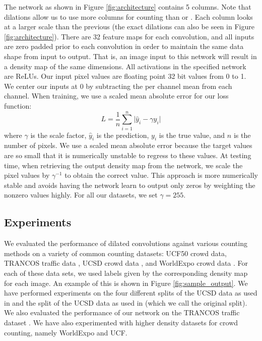 \documentclass[10pt,twocolumn,letterpaper]{article}
\begin{document}
The network as shown in Figure \ref{fig:architecture} contains 5 columns. Note that dilations allow us to use more columns for counting than \cite{zhang2016single} or \cite{chen2017deeplab}. Each column looks at a larger scale than the previous (the exact dilations can also be seen in Figure \ref{fig:architecture}). There are 32 feature maps for each convolution, and all inputs are zero padded prior to each convolution in order to maintain the same data shape from input to output. That is, an image input to this network will result in a density map of the same dimensions. All activations in the specified network are ReLUs. Our input pixel values are floating point 32 bit values from 0 to 1. We center our inputs at 0 by subtracting the per channel mean from each channel. When training, we use a scaled mean absolute error for our loss function:
\begin{equation}
L = \frac{1}{n}\sum_{i=1}^n\lvert \hat{y}_i - \gamma y_i \rvert
\end{equation}
where \(\gamma\) is the scale factor, \(\hat{y}_i\) is the prediction, \(y_i\) is the true value, and \(n\) is the number of pixels. We use a scaled mean absolute error because the target values are so small that it is numerically unstable to regress to these values. At testing time, when retrieving the output density map from the network, we scale the pixel values by \(\gamma^{-1}\) to obtain the correct value. This approach is more numerically stable and avoids having the network learn to output only zeros by weighting the nonzero values highly. For all our datasets, we set \(\gamma = 255\).

\subsection{Experiments}

We evaluated the performance of dilated convolutions against various counting methods on a variety of common counting datasets: UCF50 crowd data, TRANCOS traffic data \cite{rubio2016}, UCSD crowd data \cite{chan2008privacy}, and WorldExpo crowd data \cite{zhang2015cross}. For each of these data sets, we used labels given by the corresponding density map for each image. An example of this is shown in Figure \ref{fig:sample_output}. We have performed experiments on the four different splits of the UCSD data as used in \cite{rubio2016} and the split of the UCSD data as used in \cite{zhang2016single} (which we call the original split). We also evaluated the performance of our network on the TRANCOS traffic dataset \cite{TRANCOSdataset_IbPRIA2015}. We have also experimented with higher density datasets for crowd counting, namely WorldExpo and UCF.
\end{document}
